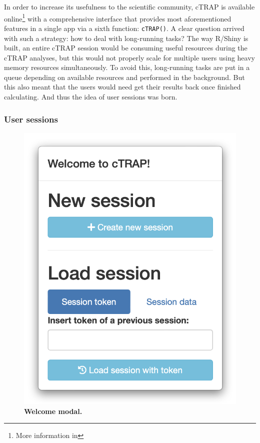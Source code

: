 In order to increase its usefulness to the scientific community, cTRAP is available online\footnote{More information in } with a comprehensive interface that provides most aforementioned features in a single app via a sixth function: \texttt{cTRAP()}. A clear question arrived with such a strategy: how to deal with long-running tasks? The way R/Shiny is built, an entire cTRAP session would be consuming useful resources during the cTRAP analyses, but this would not properly scale for multiple users using heavy memory resources simultaneously. To avoid this, long-running tasks are put in a queue depending on available resources and performed in the background. But this also meant that the users would need get their results back once finished calculating. And thus the idea of user sessions was born.

\subsubsection{User sessions}
\label{sec:ctrap-web}

\begin{figure}
  \vspace{-2\intextsep}
  \includegraphics[width=\linewidth]{images/ctrap/welcome}
  \caption[Welcome screen modal]{\textbf{Welcome modal.}}
  \vspace{-1\intextsep}
  \label{fig:ctrap-welcome}
\end{figure}

